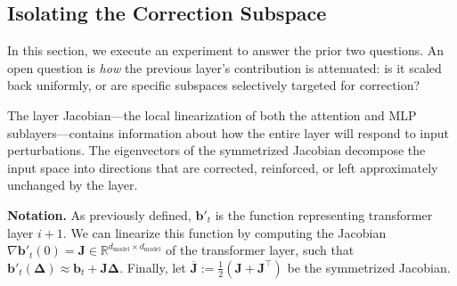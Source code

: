 



\subsection{Isolating the Correction Subspace} \label{sec:jacobian-selective}



In this section, we execute an experiment to answer the prior two questions. An open question is \textit{how} the previous layer's contribution is attenuated: is it scaled back uniformly, or are specific subspaces selectively targeted for correction?

The layer Jacobian---the local linearization of both the attention and MLP sublayers---contains information about how the entire layer will respond to input perturbations. The eigenvectors of the symmetrized Jacobian decompose the input space into directions that are corrected, reinforced, or left approximately unchanged by the layer.

\textbf{Notation.} As previously defined, $\mathbf{b}'_t$ is the function representing transformer layer $i+1$. We can linearize this function by computing the Jacobian $\nabla \mathbf{b}'_t(0) = \mathbf{J} \in \mathbb{R}^{d_\text{model} \times d_\text{model}}$ of the transformer layer, such that $\mathbf{b}'_t(\mathbf{\Delta}) \approx \mathbf{b}_t +\mathbf{J}\mathbf{\Delta}$. Finally, let $\overline{\mathbf{J}} := \frac{1}{2}(\mathbf{J} + \mathbf{J}^\top)$ be the symmetrized Jacobian.

